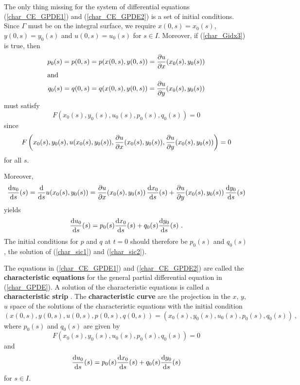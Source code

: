 The only thing missing for the system of differential equations
(\ref{char_CE_GPDE1}) and (\ref{char_CE_GPDE2}) is a set of initial
conditions.  Since $\Gamma$ must be on the integral surface, we
require $x(0,s) = x_0(s)$, $y(0,s) = y_0(s)$ and $u(0,s) = u_0(s)$ for
$s\in I$.  Moreover, if (\ref{char_Gidx3}) is true, then
\begin{align*}
p_0(s) = p(0,s) &= p(x(0,s),y(0,s)) = \pdydx{u}{x}(x_0(s),y_0(s)) \\
\intertext{and}
q_0(s) = q(0,s) &= q(x(0,s),y(0,s)) = \pdydx{u}{y}(x_0(s),y_0(s))
\end{align*}
must satisfy
\begin{equation} \label{char_sic1}
F\left( x_0(s), y_0(s), u_0(s), p_0(s), q_0(s)\right) = 0
\end{equation}
since
\[
F\left( x_0(s), y_0(s), u(x_0(s),y_0(s)), \pdydx{u}{x}(x_0(s),y_0(s)),
\pdydx{u}{y}(x_0(s),y_0(s)) \right) = 0
\]
for all $s$.

Moreover,
\[
\dydx{u_0}{s}(s) = \dfdx{u(x_0(s),y_0(s))}{s}
= \pdydx{u}{x}(x_0(s),y_0(s))\,\dydx{x_0}{s}(s)
+ \pdydx{u}{y}(x_0(s),y_0(s))\,\dydx{y_0}{s}(s)
\]
yields
\begin{equation} \label{char_sic2}
\dydx{u_0}{s}(s) = p_0(s)\dydx{x_0}{s}(s)+ q_0(s)\dydx{y_0}{s}(s) \ .
\end{equation}
The initial conditions for $p$ and $q$ at $t=0$ should therefore be
$p_0(s)$ and $q_0(s)$, the solution of (\ref{char_sic1}) and
(\ref{char_sic2}).

\begin{defn} \label{char_gdefn}
The equations in (\ref{char_CE_GPDE1}) and (\ref{char_CE_GPDE2}) are
called the
{\bfseries characteristic equations}%
for the general partial differential equation in (\ref{char_GPDE}).  A solution of the
characteristic equations is called a
{\bfseries characteristic strip}%
.  The
{\bfseries characteristic curve}%
 are the
projection in the $x$, $y$, $u$ space of the solutions of the
characteristic equations with the initial condition
\[
\left( x(0,s) , y(0,s) , u(0,s) , p(0,s) , q(0,s) \right) =
\left( x_0(s) , y_0(s) , u_0(s) , p_0(s) , q_0(s) \right) \ ,
\]
where $p_0(s)$ and $q_0(s)$ are given by
\begin{equation} \label{char_sic1D}
F\left(x_0(s),y_0(s),u_0(s), p_0(s),q_0(s) \right) = 0
\end{equation}
and
\begin{equation} \label{char_sic2D}
\dydx{u_0}{s}(s) = p_0(s)\dydx{x_0}{s}(s)+ q_0(s)\dydx{y_0}{s}(s)
\end{equation}
for $s \in I$.
\end{defn}

